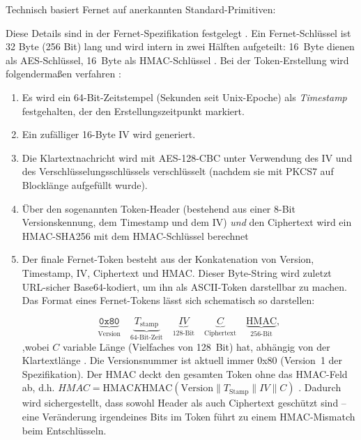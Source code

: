 Technisch basiert Fernet auf anerkannten Standard-Primitiven:  Diese Details sind in der Fernet-Spezifikation festgelegt \cite{FernetSpec}. Ein Fernet-Schlüssel ist 32 Byte (256 Bit) lang und wird intern in zwei Hälften aufgeteilt: 16 Byte dienen als AES-Schlüssel, 16 Byte als HMAC-Schlüssel \cite{FernetSpec}. Bei der Token-Erstellung wird folgendermaßen verfahren \cite{FernetSpec}:
\begin{enumerate}
    \item Es wird ein 64-Bit-Zeitstempel (Sekunden seit Unix-Epoche) als \textit{Timestamp} festgehalten, der den Erstellungszeitpunkt markiert.
    \item Ein zufälliger 16-Byte IV wird generiert.
    \item Die Klartextnachricht wird mit AES-128-CBC unter Verwendung des IV und des Verschlüsselungsschlüssels verschlüsselt (nachdem sie mit PKCS7 auf Blocklänge aufgefüllt wurde).
    \item Über den sogenannten Token-Header (bestehend aus einer 8-Bit Versionskennung, dem Timestamp und dem IV) \textit{und} den Ciphertext wird ein HMAC-SHA256 mit dem HMAC-Schlüssel berechnet
    \item  Der finale Fernet-Token besteht aus der Konkatenation von Version, Timestamp, IV, Ciphertext und HMAC. Dieser Byte-String wird zuletzt URL-sicher Base64-kodiert, um ihn als ASCII-Token darstellbar zu machen. Das Format eines Fernet-Tokens lässt sich schematisch so darstellen: 


\[
\underbrace{\texttt{0x80}}_{\text{Version}} 
\quad
\underbrace{T_{\text{stamp}}}_{\text{64-Bit-Zeit}} 
\quad
\underbrace{IV}_{\text{128-Bit}} 
\quad
\underbrace{C}_{\text{Ciphertext}} 
\quad
\underbrace{\mathrm{HMAC}}_{\text{256-Bit}},
\]
,wobei $C$ variable Länge (Vielfaches von 128 Bit) hat, abhängig von der Klartextlänge \cite{FernetSpec}. Die Versionsnummer ist aktuell immer 0x80 (Version 1 der Spezifikation). Der HMAC deckt den gesamten Token ohne das HMAC-Feld ab, d.h. $HMAC = \mathrm{HMAC}{K{\text{HMAC}}}(\text{Version} \parallel T_{\text{Stamp}} \parallel IV \parallel C)$ \cite{FernetSpec}. Dadurch wird sichergestellt, dass sowohl Header als auch Ciphertext geschützt sind – eine Veränderung irgendeines Bits im Token führt zu einem HMAC-Mismatch beim Entschlüsseln.
\end{enumerate}

